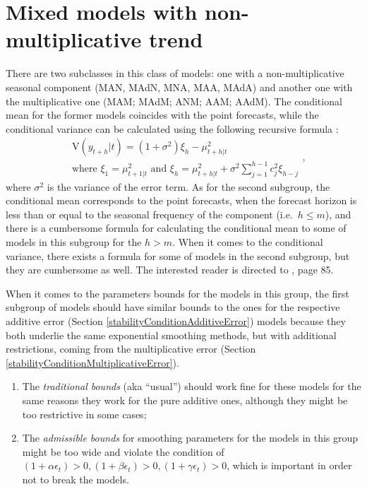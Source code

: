 \documentclass[
]{book}
\providecommand{\tightlist}{%
  \setlength{\itemsep}{0pt}\setlength{\parskip}{0pt}}
\theoremstyle{definition}
\theoremstyle{definition}
\theoremstyle{definition}
\theoremstyle{definition}
\theoremstyle{remark}
\begin{document}
\hypertarget{ADAMETSMixedModelsGroup3}{%
\section{Mixed models with non-multiplicative trend}\label{ADAMETSMixedModelsGroup3}}

There are two subclasses in this class of models: one with a non-multiplicative seasonal component (MAN, MAdN, MNA, MAA, MAdA) and another one with the multiplicative one (MAM; MAdM; ANM; AAM; AAdM). The conditional mean for the former models coincides with the point forecasts, while the conditional variance can be calculated using the following recursive formula \citep[page 84]{Hyndman2008b}:
\begin{equation}
    \begin{aligned}
    & \mathrm{V}(y_{t+h}|t) = (1+\sigma^2) \xi_h -\mu_{t+h|t}^2 \\
    & \text{where } \xi_{1} = \mu_{t+1|t}^2 \text{ and } \xi_h = \mu_{t+h|t}^2 + \sigma^2 \sum_{j=1}^{h-1} c_{j}^2 \xi_{h-j}
    \end{aligned} ,
    \label{eq:ETSADAMMixedModels31Variance}
\end{equation}
where \(\sigma^2\) is the variance of the error term. As for the second subgroup, the conditional mean corresponds to the point forecasts, when the forecast horizon is less than or equal to the seasonal frequency of the component (i.e.~\(h\leq m\)), and there is a cumbersome formula for calculating the conditional mean to some of models in this subgroup for the \(h>m\). When it comes to the conditional variance, there exists a formula for some of models in the second subgroup, but they are cumbersome as well. The interested reader is directed to \citet{Hyndman2008b}, page 85.

When it comes to the parameters bounds for the models in this group, the first subgroup of models should have similar bounds to the ones for the respective additive error (Section \ref{stabilityConditionAdditiveError}) models because they both underlie the same exponential smoothing methods, but with additional restrictions, coming from the multiplicative error (Section \ref{stabilityConditionMultiplicativeError}).

\begin{enumerate}
\def\labelenumi{\arabic{enumi}.}
\tightlist
\item
  The \emph{traditional bounds} (aka ``usual'') should work fine for these models for the same reasons they work for the pure additive ones, although they might be too restrictive in some cases;
\item
  The \emph{admissible bounds} for smoothing parameters for the models in this group might be too wide and violate the condition of \((1+ \alpha \epsilon_t)>0, (1+ \beta \epsilon_t)>0, (1+ \gamma \epsilon_t)>0\), which is important in order not to break the models.
\end{enumerate}
\end{document}
